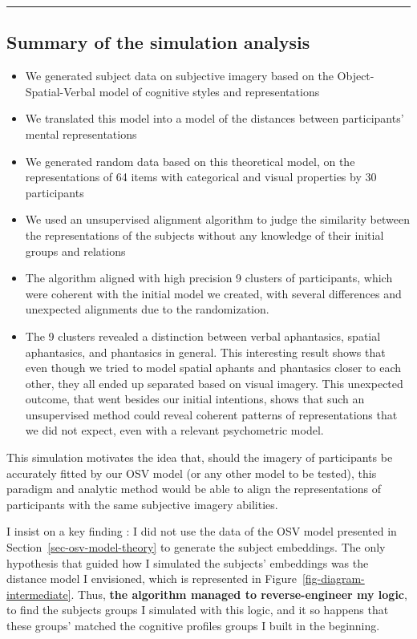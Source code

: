 \documentclass[
  authoryear]{elsarticle}
\begin{document}
\begin{center}\rule{0.5\linewidth}{0.5pt}\end{center}

\subsection{Summary of the simulation
analysis}\label{summary-of-the-simulation-analysis}

\begin{itemize}
\item
  We generated subject data on subjective imagery based on the
  Object-Spatial-Verbal model of cognitive styles and representations
\item
  We translated this model into a model of the distances between
  participants' mental representations
\item
  We generated random data based on this theoretical model, on the
  representations of 64 items with categorical and visual properties by
  30 participants
\item
  We used an unsupervised alignment algorithm to judge the similarity
  between the representations of the subjects without any knowledge of
  their initial groups and relations
\item
  The algorithm aligned with high precision 9 clusters of participants,
  which were coherent with the initial model we created, with several
  differences and unexpected alignments due to the randomization.
\item
  The 9 clusters revealed a distinction between verbal aphantasics,
  spatial aphantasics, and phantasics in general. This interesting
  result shows that even though we tried to model spatial aphants and
  phantasics closer to each other, they all ended up separated based on
  visual imagery. This unexpected outcome, that went besides our initial
  intentions, shows that such an unsupervised method could reveal
  coherent patterns of representations that we did not expect, even with
  a relevant psychometric model.
\end{itemize}

This simulation motivates the idea that, should the imagery of
participants be accurately fitted by our OSV model (or any other model
to be tested), this paradigm and analytic method would be able to align
the representations of participants with the same subjective imagery
abilities.

I insist on a key finding : I did not use the data of the OSV model
presented in Section~\ref{sec-osv-model-theory} to generate the subject
embeddings. The only hypothesis that guided how I simulated the
subjects' embeddings was the distance model I envisioned, which is
represented in Figure~\ref{fig-diagram-intermediate}. Thus, \textbf{the
algorithm managed to reverse-engineer my logic}, to find the subjects
groups I simulated with this logic, and it so happens that these groups'
matched the cognitive profiles groups I built in the beginning.
\end{document}
